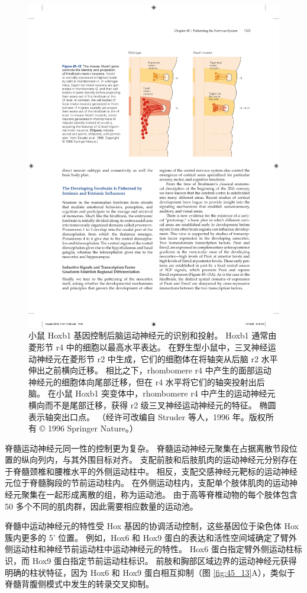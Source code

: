 \begin{figure}[htbp]
	\centering
	\includegraphics[width=0.75\linewidth]{chap45/fig_45_12}
	\caption{小鼠 Hoxb1 基因控制后脑运动神经元的识别和投射。 Hoxb1 通常由菱形节 r4 中的细胞以最高水平表达。 在野生型小鼠中，三叉神经运动神经元在菱形节 r2 中生成，它们的细胞体在将轴突从后脑 r2 水平伸出之前横向迁移。 相比之下，rhombomere r4 中产生的面部运动神经元的细胞体向尾部迁移，但在 r4 水平将它们的轴突投射出后脑。 在小鼠 Hoxb1 突变体中，rhombomere r4 中产生的运动神经元横向而不是尾部迁移，获得 r2 级三叉神经运动神经元的特征。 椭圆表示轴突出口点。 （经许可改编自 Struder 等人，1996 年。版权所有 © 1996 Springer Nature。）}
	\label{fig:45_12}
\end{figure}

脊髓运动神经元同一性的控制更为复杂。 脊髓运动神经元聚集在占据离散节段位置的纵向列内，与其外围目标对齐。 支配前肢和后肢肌肉的运动神经元分别存在于脊髓颈椎和腰椎水平的外侧运动柱中。 相反，支配交感神经元靶标的运动神经元位于脊髓胸段的节前运动柱内。 在外侧运动柱内，支配单个肢体肌肉的运动神经元聚集在一起形成离散的组，称为运动池。 由于高等脊椎动物的每个肢体包含 50 多个不同的肌肉群，因此需要相应数量的运动池。

脊髓中运动神经元的特性受 Hox 基因的协调活动控制，这些基因位于染色体 Hox 簇内更多的 5' 位置。 例如，Hox6 和 Hox9 蛋白的表达和活性空间域确定了臂外侧运动柱和神经节前运动柱中运动神经元的特性。 Hox6 蛋白指定臂外侧运动柱标识，而 Hox9 蛋白指定节前运动柱标识。 
前肢和胸部区域边界的运动神经元获得明确的柱状特征，因为 Hox6 和 Hox9 蛋白相互抑制（图 \ref{fig:45_13}A），类似于脊髓背腹侧模式中发生的转录交叉抑制。

